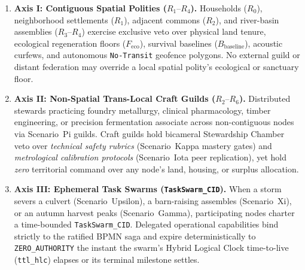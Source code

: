 \begin{enumerate}
    \item \textbf{Axis I: Contiguous Spatial Polities ($R_1\text{--}R_4$).} Households ($R_0$),
    neighborhood settlements ($R_1$), adjacent commons ($R_2$), and river-basin assemblies
    ($R_3\text{--}R_4$) exercise exclusive veto over physical land tenure, ecological regeneration
    floors ($F_{\mathrm{eco}}$), survival baselines ($B_{\mathrm{baseline}}$), acoustic curfews,
    and autonomous \texttt{No-Transit} geofence polygons. No external guild or distant federation
    may override a local spatial polity's ecological or sanctuary floor.
    \item \textbf{Axis II: Non-Spatial Trans-Local Craft Guilds ($R_2\text{--}R_6$).} Distributed
    stewards practicing foundry metallurgy, clinical pharmacology, timber engineering, or
    precision fermentation associate across non-contiguous nodes via Scenario~Pi guilds. Craft
    guilds hold bicameral Stewardship Chamber veto over \textit{technical safety rubrics}
    (Scenario~Kappa mastery gates) and \textit{metrological calibration protocols} (Scenario~Iota
    peer replication), yet hold \textit{zero} territorial command over any node's land, housing,
    or surplus allocation.
    \item \textbf{Axis III: Ephemeral Task Swarms (\texttt{TaskSwarm\_CID}).} When a storm severs
    a culvert (Scenario~Upsilon), a barn-raising assembles (Scenario~Xi), or an autumn harvest
    peaks (Scenario~Gamma), participating nodes charter a time-bounded \texttt{TaskSwarm\_CID}.
    Delegated operational capabilities bind strictly to the ratified BPMN saga and expire
    deterministically to \texttt{ZERO\_AUTHORITY} the instant the swarm's Hybrid Logical Clock
    \parencite{kulkarni2014logical} time-to-live (\texttt{ttl\_hlc}) elapses or its terminal
    milestone settles.
\end{enumerate}

